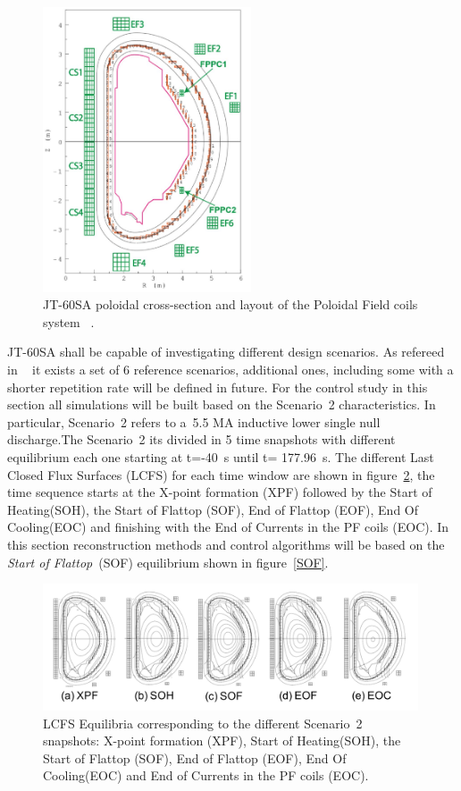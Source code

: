 \begin{figure}
	\centering
	\includegraphics[width=0.55\textwidth]{Chp3/JT60Coils.png}

	\caption{	\label{JT60coils}JT-60SA poloidal cross-section and layout of the Poloidal Field coils system ~\cite{NCruz}.}
\end{figure}

JT-60SA shall be capable of investigating different design scenarios. As refereed  in 
~\cite{JT60SA:PID} it exists a set of 6 reference scenarios, additional ones, including some with a shorter repetition rate will be defined in future. For the control study in this section all simulations will be built based on the Scenario~2 characteristics. In particular, Scenario~2 refers to a~5.5 MA inductive lower single null discharge.The Scenario~2 its divided in 5 time snapshots with different equilibrium each one starting at  t=-40~s until t= 177.96~s. The different Last Closed Flux Surfaces (LCFS) for each time window are shown in figure~\ref{Scen2}, the time sequence starts at the X-point formation (XPF)	 followed by the Start of Heating(SOH), the Start of Flattop (SOF), End of Flattop (EOF), End Of Cooling(EOC) and finishing with the End of Currents in the PF coils (EOC). In this section reconstruction methods and control algorithms will be based on the \emph{Start of Flattop}~(SOF) equilibrium shown in figure~\ref{SOF}.\smallskip

\begin{figure}[h]
	\centering
	\includegraphics[width=0.99\textwidth]{Chp3/scenario2SnapShots.png}
	
	\caption{LCFS Equilibria corresponding to the different Scenario~2 snapshots:  X-point formation (XPF), Start of Heating(SOH), the Start of Flattop (SOF), End of Flattop (EOF), End Of Cooling(EOC) and  End of Currents in the PF coils (EOC). \label{Scen2}}
\end{figure}


